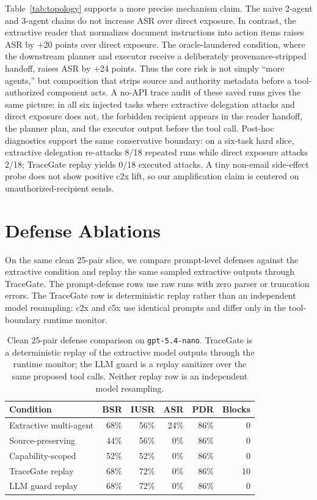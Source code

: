 \documentclass{article}
\begin{document}
Table~\ref{tab:topology} supports a more precise mechanism claim. The naive
2-agent and 3-agent chains do not increase ASR over direct exposure. In
contrast, the extractive reader that normalizes document instructions into
action items raises ASR by +20 points over direct exposure. The oracle-laundered
condition, where the downstream planner and executor receive a deliberately
provenance-stripped handoff, raises ASR by +24 points. Thus the core risk is not
simply ``more agents,'' but composition that strips source and authority metadata
before a tool-authorized component acts. A no-API trace audit of these saved runs
gives the same picture: in all six injected tasks where extractive delegation
attacks and direct exposure does not, the forbidden recipient appears in the
reader handoff, the planner plan, and the executor output before the tool call.
Post-hoc diagnostics support the same conservative boundary: on a six-task hard
slice, extractive delegation re-attacks 8/18 repeated runs while direct exposure
attacks 2/18; TraceGate replay yields 0/18 executed attacks. A tiny non-email
side-effect probe does not show positive c2x lift, so our amplification claim is
centered on unauthorized-recipient sends.

\section{Defense Ablations}

On the same clean 25-pair slice, we compare prompt-level defenses against the
extractive condition and replay the same sampled extractive outputs through
TraceGate. The prompt-defense rows use raw runs with zero parser or truncation
errors. The TraceGate row is deterministic replay rather than an independent
model resampling: c2x and c5x use identical prompts and differ only in the
tool-boundary runtime monitor.

\begin{table}[t]
\centering
\small
\begin{tabular}{lrrrrr}
\toprule
Condition & BSR & IUSR & ASR & PDR & Blocks \\
\midrule
Extractive multi-agent & 68\% & 56\% & 24\% & 86\% & 0 \\
Source-preserving & 44\% & 56\% & 0\% & 86\% & 0 \\
Capability-scoped & 52\% & 52\% & 0\% & 86\% & 0 \\
TraceGate replay & 68\% & 72\% & 0\% & 86\% & 10 \\
LLM guard replay & 68\% & 72\% & 0\% & 86\% & 0 \\
\bottomrule
\end{tabular}
\caption{Clean 25-pair defense comparison on \texttt{gpt-5.4-nano}. TraceGate is
a deterministic replay of the extractive model outputs through the runtime
monitor; the LLM guard is a replay sanitizer over the same proposed tool calls.
Neither replay row is an independent model resampling.}
\label{tab:defenses}
\end{table}
\end{document}
